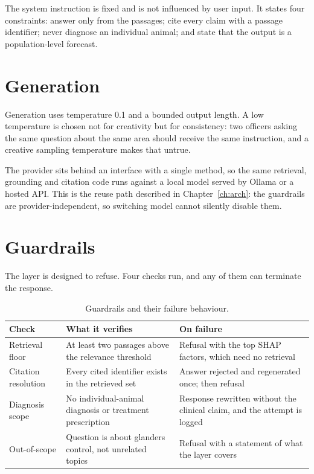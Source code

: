 \documentclass[10pt,openany]{report}
\begin{document}
The system instruction is fixed and is not influenced by user input. It states four constraints:
answer only from the passages; cite every claim with a passage identifier; never diagnose an
individual animal; and state that the output is a population-level forecast.

\section{Generation}

Generation uses temperature 0.1 and a bounded output length. A low temperature is chosen not for
creativity but for consistency: two officers asking the same question about the same area should
receive the same instruction, and a creative sampling temperature makes that untrue.

The provider sits behind an interface with a single method, so the same retrieval, grounding and
citation code runs against a local model served by Ollama or a hosted API. This is the reuse path
described in Chapter~\ref{ch:arch}: the guardrails are provider-independent, so switching model
cannot silently disable them.

\section{Guardrails}

The layer is designed to refuse. Four checks run, and any of them can terminate the response.

\begin{table}[htbp]
\centering
\caption{Guardrails and their failure behaviour.}
\label{tab:guardrails}
\small
\begin{tabular}{@{}>{\raggedright\arraybackslash}p{3.2cm}>{\raggedright\arraybackslash}p{5.0cm}>{\raggedright\arraybackslash}p{5.6cm}@{}}
\toprule
\textbf{Check} & \textbf{What it verifies} & \textbf{On failure} \\
\midrule
Retrieval floor & At least two passages above the relevance threshold & Refusal with the top SHAP factors, which need no retrieval \\
Citation resolution & Every cited identifier exists in the retrieved set & Answer rejected and regenerated once; then refusal \\
Diagnosis scope & No individual-animal diagnosis or treatment prescription & Response rewritten without the clinical claim, and the attempt is logged \\
Out-of-scope & Question is about glanders control, not unrelated topics & Refusal with a statement of what the layer covers \\
\bottomrule
\end{tabular}
\end{table}
\end{document}

